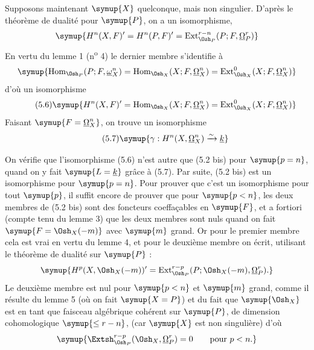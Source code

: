 Supposons maintenant $\symup{X}$ quelconque, mais non singulier. D'après le théorème de
dualité pour $\symup{P}$, on a un isomorphisme,
\[
  \symup{H^{n}(X,F)'=H^{n}(P,F)'
  =\operatorname{Ext}_{\Osh_P}^{r-n}(P;F,\underline{\Omega}_P^{r})}
\]
En vertu du lemme 1 (n\textsuperscript{o} 4) le dernier membre s'identifie à
\[
  \symup{\operatorname{Hom}_{\Osh_P}(P;F,\underline{\omega}_X^{n})
  =\operatorname{Hom}_{\Osh_X}(X;F,\underline{\Omega}_X^{n})
  =\operatorname{Ext}_{\Osh_X}^{0}(X;F,\underline{\Omega}_X^{n})}
\]
d'où un isomorphisme
\begin{equation}\tag{5.6}
  \symup{H^{n}(X,F)'=\operatorname{Hom}_{\Osh_X}(X;F,\underline{\Omega}_X^{n})
  =\operatorname{Ext}_{\Osh_X}^{0}(X;F,\underline{\Omega}_X^{n})}
\end{equation}
Faisant $\symup{F=\underline{\Omega}_X^{n}}$, on trouve un isomorphisme
\begin{equation}\tag{5.7}
  \symup{\gamma:H^{n}(X,\underline{\Omega}_X^{n})\xrightarrow{\sim}\underline{k}}
\end{equation}

On vérifie que l'isomorphisme (5.6) n'est autre que (5.2 bis) pour $\symup{p=n}$, quand
on y fait $\symup{L=\underline{k}}$ grâce à (5.7). Par suite, (5.2 bis) est un isomorphisme pour
$\symup{p=n}$. Pour prouver que c'est un isomorphisme pour tout $\symup{p}$, il suffit encore
de prouver que pour $\symup{p<n}$, les deux membres de (5.2 bis) sont des foncteurs
coeffaçables en $\symup{F}$, et a fortiori (compte tenu du lemme 3) que les deux membres
sont nuls quand on fait $\symup{F=\Osh_X(-m)}$ avec $\symup{m}$ grand. Or pour le premier
membre cela est vrai en vertu du lemme 4, et pour le deuxième membre on écrit,
utilisant le théorème de dualité sur $\symup{P}$ :
\[
  \symup{H^{p}(X,\Osh_X(-m))'
  =\operatorname{Ext}_{\Osh_P}^{r-p}
    (P;\Osh_X(-m),\underline{\Omega}_P^{r}).}
\]
Le deuxième membre est nul pour $\symup{p<n}$ et $\symup{m}$ grand, comme il résulte du lemme 5
(où on fait $\symup{X=P}$) et du fait que $\symup{\Osh_X}$ est en tant que faisceau algébrique
cohérent sur $\symup{P}$, de dimension cohomologique $\symup{\leq r-n}$, (car $\symup{X}$ est non
singulière) d'où
\[
  \symup{\Extsh_{\Osh_P}^{r-p}(\Osh_X,\underline{\Omega}_P^{r})=0
  \qquad\text{pour }p<n.}
\]


